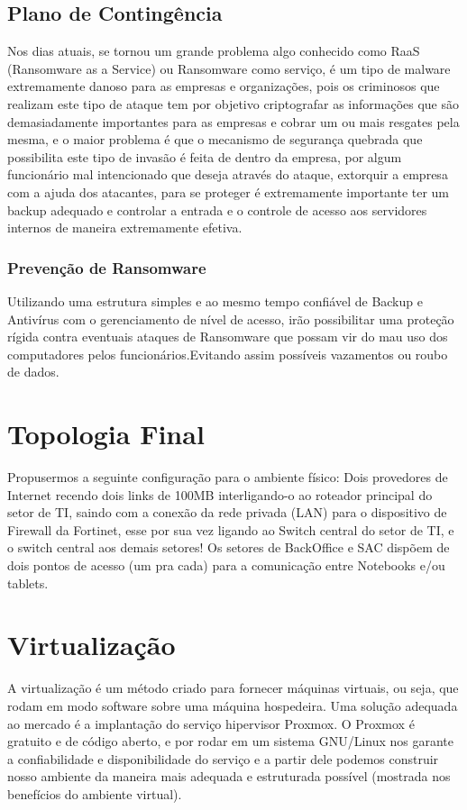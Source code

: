\documentclass[12pt]{article}
\begin{document}
\subsection{Plano de Contingência}
Nos dias atuais, se tornou um grande problema algo conhecido como RaaS (Ransomware as a Service) ou Ransomware como serviço, é um tipo de malware extremamente danoso para as empresas e organizações, pois os criminosos que realizam este tipo de ataque tem por objetivo criptografar as informações que são demasiadamente importantes para as empresas e cobrar um ou mais resgates pela mesma, e o maior problema é que o mecanismo de segurança quebrada que possibilita este tipo de invasão é feita de dentro da empresa, por algum funcionário mal intencionado que deseja através do ataque, extorquir a empresa com a ajuda dos atacantes, para se proteger é extremamente importante ter um backup adequado e controlar a entrada e o controle de acesso aos servidores internos de maneira extremamente efetiva.

\subsubsection{Prevenção de Ransomware}
Utilizando uma estrutura simples e ao mesmo tempo confiável de Backup e Antivírus com o gerenciamento de nível de acesso, irão possibilitar uma proteção rígida contra eventuais ataques de Ransomware que possam vir do mau uso dos computadores pelos funcionários.Evitando assim possíveis vazamentos ou roubo de dados.

\section{Topologia Final}
Propusermos a seguinte configuração para o ambiente físico: Dois provedores de Internet recendo dois links de 100MB interligando-o ao roteador principal do setor de TI, saindo com a conexão da rede privada (LAN) para o dispositivo de Firewall da Fortinet, esse por sua vez ligando ao Switch central do setor de TI, e o switch central aos demais setores! Os setores de BackOffice e SAC dispõem de dois pontos de acesso (um pra cada) para a comunicação entre Notebooks e/ou tablets.

\section{Virtualização}
A virtualização é um método criado para fornecer máquinas virtuais, ou seja, que rodam em modo software sobre uma máquina hospedeira. Uma solução adequada ao mercado é a implantação do serviço hipervisor Proxmox. O Proxmox é gratuito e de código aberto, e por rodar em um sistema GNU/Linux nos garante a confiabilidade e disponibilidade do serviço e a partir dele podemos construir nosso ambiente da maneira mais adequada e estruturada possível (mostrada nos benefícios do ambiente virtual).
\end{document}
